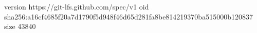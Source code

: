 version https://git-lfs.github.com/spec/v1
oid sha256:a16cf4685f20a7d1790f5d948f46d65d281fa8be814219370ba515000b120837
size 43840
